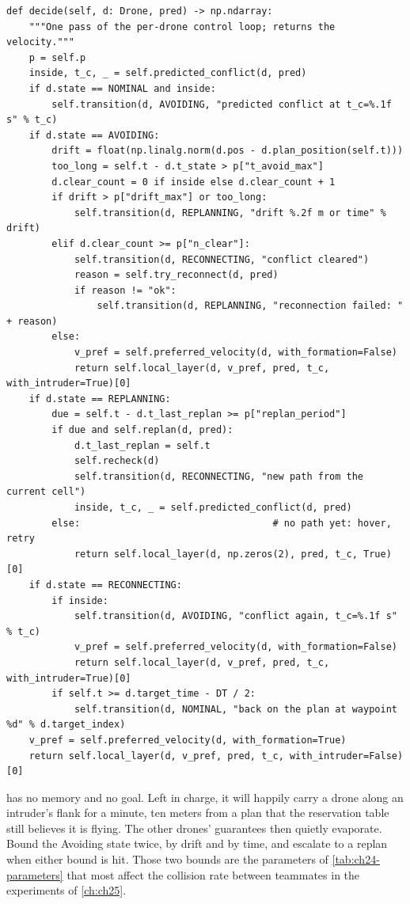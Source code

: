 \begin{lstlisting}[caption={The per-drone control cycle (from \code{code/ch24\_hybrid.py}), the state machine of \cref{alg:ch24-loop}.},label={lst:ch24-loop}]
def decide(self, d: Drone, pred) -> np.ndarray:
    """One pass of the per-drone control loop; returns the velocity."""
    p = self.p
    inside, t_c, _ = self.predicted_conflict(d, pred)
    if d.state == NOMINAL and inside:
        self.transition(d, AVOIDING, "predicted conflict at t_c=%.1f s" % t_c)
    if d.state == AVOIDING:
        drift = float(np.linalg.norm(d.pos - d.plan_position(self.t)))
        too_long = self.t - d.t_state > p["t_avoid_max"]
        d.clear_count = 0 if inside else d.clear_count + 1
        if drift > p["drift_max"] or too_long:
            self.transition(d, REPLANNING, "drift %.2f m or time" % drift)
        elif d.clear_count >= p["n_clear"]:
            self.transition(d, RECONNECTING, "conflict cleared")
            reason = self.try_reconnect(d, pred)
            if reason != "ok":
                self.transition(d, REPLANNING, "reconnection failed: " + reason)
        else:
            v_pref = self.preferred_velocity(d, with_formation=False)
            return self.local_layer(d, v_pref, pred, t_c, with_intruder=True)[0]
    if d.state == REPLANNING:
        due = self.t - d.t_last_replan >= p["replan_period"]
        if due and self.replan(d, pred):
            d.t_last_replan = self.t
            self.recheck(d)
            self.transition(d, RECONNECTING, "new path from the current cell")
            inside, t_c, _ = self.predicted_conflict(d, pred)
        else:                                  # no path yet: hover, retry
            return self.local_layer(d, np.zeros(2), pred, t_c, True)[0]
    if d.state == RECONNECTING:
        if inside:
            self.transition(d, AVOIDING, "conflict again, t_c=%.1f s" % t_c)
            v_pref = self.preferred_velocity(d, with_formation=False)
            return self.local_layer(d, v_pref, pred, t_c, with_intruder=True)[0]
        if self.t >= d.target_time - DT / 2:
            self.transition(d, NOMINAL, "back on the plan at waypoint %d" % d.target_index)
    v_pref = self.preferred_velocity(d, with_formation=True)
    return self.local_layer(d, v_pref, pred, t_c, with_intruder=False)[0]
\end{lstlisting}



\begin{pitfall}
\orca has no memory and no goal. Left in charge, it will happily carry a
drone along an intruder's flank for a minute, ten meters from a plan that
the reservation table still believes it is flying. The other drones'
guarantees then quietly evaporate. Bound the Avoiding state twice, by drift
and by time, and escalate to a replan when either bound is hit. Those two
bounds are the parameters of \cref{tab:ch24-parameters} that most affect the
collision rate between teammates in the experiments of \cref{ch:ch25}.
\end{pitfall}

